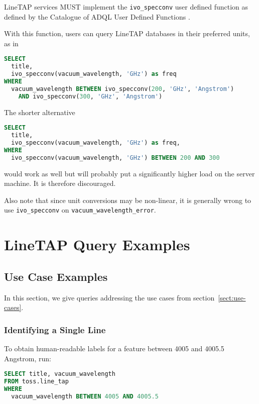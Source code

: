 \documentclass[11pt,a4paper]{ivoa}
\begin{document}
LineTAP services MUST implement the \texttt{ivo\_specconv} user defined
function as defined by the Catalogue of ADQL User Defined Functions
\citep{2021ivoa.spec.0310C}.

With this function, users can query LineTAP databases in their preferred
units, as in

\begin{lstlisting}[language=SQL]
SELECT 
  title,
  ivo_specconv(vacuum_wavelength, 'GHz') as freq
WHERE
  vacuum_wavelength BETWEEN ivo_specconv(200, 'GHz', 'Angstrom') 
    AND ivo_specconv(300, 'GHz', 'Angstrom')
\end{lstlisting}

The shorter alternative

\begin{lstlisting}[language=SQL]
SELECT 
  title,
  ivo_specconv(vacuum_wavelength, 'GHz') as freq,
WHERE
  ivo_specconv(vacuum_wavelength, 'GHz') BETWEEN 200 AND 300
\end{lstlisting}

\noindent would work as well but will probably put a significantly higher load on
the server machine.  It is therefore discouraged.

Also note that since unit conversions may be non-linear, it is generally
wrong to use \texttt{ivo\_specconv} on
\texttt{vacuum\_wavelength\_error}.


\section{LineTAP Query Examples}

\subsection{Use Case Examples}

In this section, we give queries addressing the use cases from
section~\ref{sect:use-cases}.

\subsubsection{Identifying a Single Line}

To obtain human-readable labels for a feature between 4005 and 4005.5
Angstrom, run:

\begin{lstlisting}[language=SQL]
SELECT title, vacuum_wavelength
FROM toss.line_tap
WHERE
  vacuum_wavelength BETWEEN 4005 AND 4005.5
\end{lstlisting}
\end{document}
